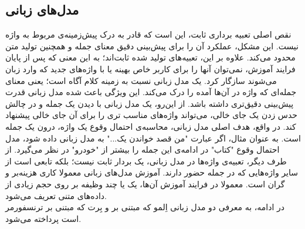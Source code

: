 \subsection{مدل‌های زبانی}
نقص اصلی تعبیه برداری ثابت، این است که قادر به درک پیش‌زمینه‌ی مربوط به واژه نیست. این مشکل، عملکرد آن را برای پیش‌بینی دقیق معنای جمله و همچنین تولید متن محدود می‌کند. علاوه بر این، تعبیه‌های تولید شده ثابت‌اند؛ به این معنی که پس از پایان فرایند آموزش، نمی‌توان آنها را برای کاربر خاص بهینه یا با واژه‌های جدید که وارد زبان می‌شوند سازگار کرد.
یک مدل زبانی نسبت به زمینه کلام آگاه است؛ یعنی معنای جمله‌ای که واژه در آن‌ها آمده را درک می‌کند. این ویژگی باعث شده مدل زبانی قدرت پیش‌بینی دقیق‌تری داشته باشد. از این‌رو، یک مدل زبانی با دیدن یک جمله و در چالش حدس زدن یک جای خالی، می‌تواند واژه‌های مناسب تری را برای آن جای خالی پیشنهاد کند. در واقع، هدف اصلی مدل زبانی، محاسبه‌ی احتمال وقوع یک واژه، درون یک جمله است. به عنوان مثال، اگر عبارت "من قصد خواندن یک..." به مدل زبانی داده شود، مدل احتمال وقوع "کتاب" در ادامه‌ی این جمله را بیشتر از "خودرو" در نظر می‌گیرد. از طرف دیگر، تعبیه‌ی واژه‌ها در مدل زبانی، یک بردار ثابت نیست؛ بلکه تابعی است از سایر واژه‌هایی که در جمله حضور دارند. آموزش مدل‌های زبانی معمولا کاری هزینه‌بر و گران است. معمولا در فرایند آموزش آن‌ها، یک یا چند وظیفه بر روی حجم زیادی از داده‌های متنی تعریف می‌شود.
 \\ 
 در ادامه، ‌به معرفی دو مدل زبانی اِلمو که مبتنی بر  و بِرت که مبتنی بر ترنسفورمر است پرداخته می‌شود.
